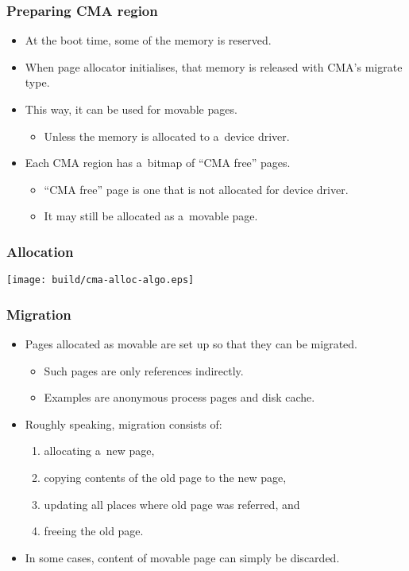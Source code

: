 \begin{frame}
  \frametitle{Preparing CMA region}

  \begin{itemize}
  \item At the boot time, some of the memory is reserved.
  \item When page allocator initialises, that memory is released with
    CMA's migrate type.
  \item This way, it can be used for movable pages.
    \begin{itemize}
    \item Unless the memory is allocated to a~device driver.
    \end{itemize}
  \item Each CMA region has a~bitmap of “CMA free” pages.
    \begin{itemize}
    \item “CMA free” page is one that is not allocated for device
      driver.
    \item It may still be allocated as a~movable page.
    \end{itemize}
  \end{itemize}
\end{frame}

\begin{frame}
  \frametitle{Allocation}

  \begin{center}
    \texttt{[image: build/cma-alloc-algo.eps]}
  \end{center}

\end{frame}

\begin{frame}
  \frametitle{Migration}

  \begin{itemize}
  \item Pages allocated as movable are set up so that they can be
    migrated.
    \begin{itemize}
    \item Such pages are only references indirectly.
    \item Examples are anonymous process pages and disk cache.
    \end{itemize}
  \item Roughly speaking, migration consists of:
    \begin{enumerate}
    \item allocating a~new page,
    \item copying contents of the old page to the new page,
    \item updating all places where old page was referred, and
    \item freeing the old page.
    \end{enumerate}
  \item In some cases, content of movable page can simply be
    discarded.
  \end{itemize}

\end{frame}
